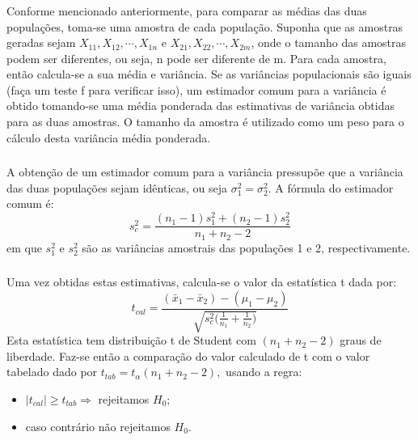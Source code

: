 \documentclass[14pt,aspectratio=1610]{beamer}
\newcommand{\bx}{\ensuremath{\bar{x}}}
\newcommand{\Ho}{\ensuremath{H_{0}}}
\begin{document}
\begin{frame}{}
\frametitle{}
\begin{block}{}
\justifying
Conforme mencionado anteriormente, para comparar as médias das duas populações, toma-se uma amostra de cada população. Suponha que as amostras geradas sejam $X_{11},X_{12},\cdots,X_{1n}$ e $X_{21},X_{22},\cdots,X_{2m}$, onde o tamanho das amostras podem ser diferentes, ou seja, n pode ser diferente de m. Para cada amostra, então calcula-se a sua média e variância. Se as variâncias populacionais são iguais (faça um teste f para verificar isso), um estimador comum para a variância é obtido tomando-se uma média ponderada das estimativas de variância obtidas para as duas amostras. O tamanho da amostra é utilizado como um peso para o cálculo desta variância média ponderada.
\end{block}
\end{frame}

\begin{frame}{}
\frametitle{}
\begin{block}{}
\justifying
A obtenção de um estimador comum para a variância pressupõe que a variância das duas populações sejam idênticas, ou seja $\sigma^{2}_{1}=\sigma^{2}_{2}.$ A fórmula do estimador comum é:
$$s_{c}^{2}=\dfrac{(n_{1}-1)s_{1}^{2}+(n_{2}-1)s_{2}^{2}}{n_{1}+n_{2}-2}$$ em que $s_{1}^{2}$ e $s_{2}^{2}$ são as variâncias amostrais das populações 1 e 2, respectivamente. 
\end{block}
\end{frame}

\begin{frame}{}
\frametitle{}
\begin{block}{}
\justifying
Uma vez obtidas estas estimativas, calcula-se o valor da estatística 
t dada por:
$$t_{cal}=\dfrac{(\bx_{1}-\bx_{2})-(\mu_{1}-\mu_{2})}{\sqrt{s_{c}^{2}\Biggl(\frac{1}{n_{1}}+\frac{1}{n_{2}}\Biggl)}}$$ 
Esta estatística tem distribuição t de Student com $(n_{1}+n_{2}-2)$ graus de liberdade. Faz-se então a comparação do valor 
calculado de t com o valor tabelado dado por $t_{tab}=t_{\alpha}(n_{1}+n_{2}-2),$ usando a regra:
\begin{itemize}
\item $|t_{cal}|\geq t_{tab}\Rightarrow$ rejeitamos $\Ho;$
\item caso contrário não rejeitamos $\Ho.$
\end{itemize}
\end{block}
\end{frame}
\end{document}

